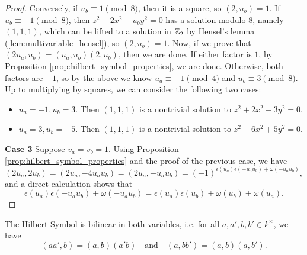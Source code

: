 \begin{proof}
		Conversely, if $u_b \equiv 1 \pmod 8$, then it is a square, so $(2, u_b)=1$.
		If $u_b \equiv -1 \pmod 8$, then $z^2-2x^2-u_by^2=0$ has a solution modulo $8$, namely $(1,1,1)$,
		which can be lifted to a solution in $\mathbb{Z}_2$ by Hensel's lemma (\ref{lem:multivariable_hensel}),
		so $(2, u_b)=1$. Now, if we prove that $(2u_a,u_b)=(u_a,u_b)(2,u_b)$, then we are done. If either
		factor is $1$, by Proposition \ref{prop:hilbert_symbol_properties}, we are done. Otherwise, both
		factors are $-1$, so by the above we know $u_a \equiv -1 \pmod 4$ and $u_b \equiv 3 \pmod 8$. Up
		to multiplying by squares, we can consider the following two cases:
		\begin{itemize}
			\item $u_a=-1,u_b=3$. Then $(1,1,1)$ is a nontrivial solution to $z^2+2x^2-3y^2=0$.
			\item $u_a=3,u_b=-5$. Then $(1,1,1)$ is a nontrivial solution to $z^2-6x^2+5y^2=0$.
		\end{itemize}

		\noindent\textbf{Case 3} Suppose $v_a=v_b=1$. Using Proposition \ref{prop:hilbert_symbol_properties} and the proof
		of the previous case, we have
		\[
		(2u_a,2u_b)=(2u_a,-4u_au_b)=(2u_a,-u_au_b)=(-1)^{\epsilon(u_a)\epsilon(-u_au_b)+\omega(-u_au_b)},
		\]
		and a direct calculation shows that
		\[
		\epsilon(u_a)\epsilon(-u_au_b)+\omega(-u_au_b) = \epsilon(u_a)\epsilon(u_b) + \omega(u_b) + \omega(u_a).
		\]
\end{proof}

\begin{theorem}
		\label{thm:bilinear}
		\leanok
The Hilbert Symbol is bilinear in both variables, i.e. for all $a, a', b, b' \in k^\times$, we have
\[
(aa',b)=(a,b)(a'b) \quad \text{and} \quad (a,bb')=(a,b)(a,b').
\]
\end{theorem}


